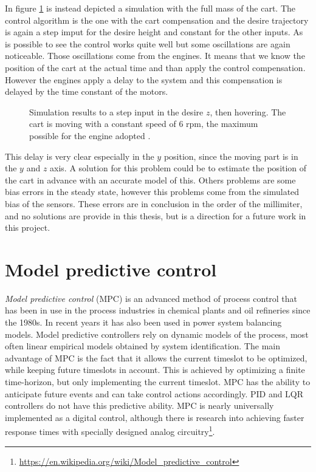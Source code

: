 \noindent In figure \ref{fig:simulation2} is instead depicted a simulation with the full mass of the cart. The control algorithm is the one with the cart compensation and the desire trajectory is again a step imput for the desire height and constant for the other inputs. As is possible to see the control works quite well but some oscillations are again noticeable. Those oscillations come from the engines. It means that we know the position of the cart at the actual time and than apply the control compensation. However the engines apply a delay to the system and this compensation is delayed by the time constant of the motors. 

\begin{figure}[h]
	\centering
 	
 	\caption{Simulation results to a step input in the desire $z$, then hovering. The cart is moving with a constant speed of $6$ rpm, the maximum possible for the engine adopted \cite{Carlos}.}
 	\label{fig:simulation2}		
\end{figure}

\noindent This delay is very clear especially in the $y$ position, since the moving part is in the $y$ and $z$ axis. A solution for this problem could be to estimate the position of the cart in advance with an accurate model of this. Others problems are some bias errors in the steady state, however this problems come from the simulated bias of the sensors. These errors are in conclusion in the order of the millimiter, and no solutions are provide in this thesis, but is a direction for a future work in this project.


\section{Model predictive control}

\textit{Model predictive control} (MPC) is an advanced method of process control that has been in use in the process industries in chemical plants and oil refineries since the 1980s. In recent years it has also been used in power system balancing models. Model predictive controllers rely on dynamic models of the process, most often linear empirical models obtained by system identification. The main advantage of MPC is the fact that it allows the current timeslot to be optimized, while keeping future timeslots in account. This is achieved by optimizing a finite time-horizon, but only implementing the current timeslot. MPC has the ability to anticipate future events and can take control actions accordingly. PID and LQR controllers do not have this predictive ability. MPC is nearly universally implemented as a digital control, although there is research into achieving faster response times with specially designed analog circuitry\footnote{\url{https://en.wikipedia.org/wiki/Model_predictive_control}}.

